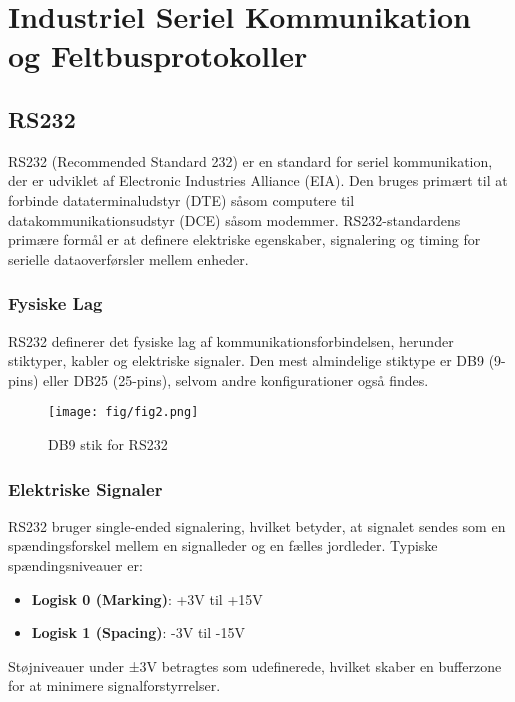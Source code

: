 \chapter{Industriel Seriel Kommunikation og Feltbusprotokoller}
\section{RS232}
RS232 (Recommended Standard 232) er en standard for seriel kommunikation, der er udviklet af Electronic Industries Alliance (EIA). Den bruges primært til at forbinde dataterminaludstyr (DTE) såsom computere til datakommunikationsudstyr (DCE) såsom modemmer. RS232-standardens primære formål er at definere elektriske egenskaber, signalering og timing for serielle dataoverførsler mellem enheder.

\subsection{Fysiske Lag}
RS232 definerer det fysiske lag af kommunikationsforbindelsen, herunder stiktyper, kabler og elektriske signaler. Den mest almindelige stiktype er DB9 (9-pins) eller DB25 (25-pins), selvom andre konfigurationer også findes.
\begin{figure}[h]
	\centering
	\texttt{[image: fig/fig2.png]} %
	\caption{DB9 stik for RS232}
	\label{fig:rs232_connector}
\end{figure}

\subsection{Elektriske Signaler}
RS232 bruger single-ended signalering, hvilket betyder, at signalet sendes som en spændingsforskel mellem en signalleder og en fælles jordleder. Typiske spændingsniveauer er:

\begin{itemize}
	\item \textbf{Logisk 0 (Marking)}: +3V til +15V
	\item \textbf{Logisk 1 (Spacing)}: -3V til -15V
\end{itemize}
Støjniveauer under ±3V betragtes som udefinerede, hvilket skaber en bufferzone for at minimere signalforstyrrelser.

